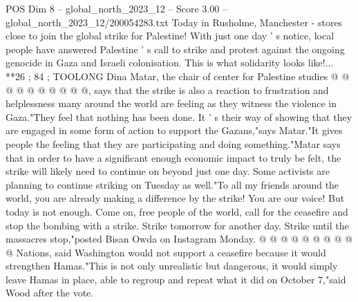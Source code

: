 \begin{textsample}{POS Dim 8 – global\_north\_2023\_12 – Score 3.00 – global\_north\_2023\_12/200054283.txt}
Today in Rusholme, Manchester - stores close to join the global strike for Palestine!
With just one day ' s notice, local people have answered Palestine ' s call to strike and protest against the ongoing genocide in Gaza and Israeli colonisation.
This is what solidarity looks like!... **26 ; 84 ; TOOLONG Dina Matar, the chair of center for Palestine studies @ @ @ @ @ @ @ @ @ @, says that the strike is also a reaction to frustration and helplessness many around the world are feeling as they witness the violence in Gaza."They feel that nothing has been done.
It ' s their way of showing that they are engaged in some form of action to support the Gazans,"says Matar."It gives people the feeling that they are participating and doing something."Matar says that in order to have a significant enough economic impact to truly be felt, the strike will likely need to continue on beyond just one day.
Some activists are planning to continue striking on Tuesday as well."To all my friends around the world, you are already making a difference by the strike!
You are our voice!
But today is not enough.
Come on, free people of the world, call for the ceasefire and stop the bombing with a strike.
Strike tomorrow for another day.
Strike until the massacres stop,"posted Bisan Owda on Instagram Monday. @ @ @ @ @ @ @ @ @ @ Nations, said Washington would not support a ceasefire because it would strengthen Hamas."This is not only unrealistic but dangerous, it would simply leave Hamas in place, able to regroup and repeat what it did on October 7,"said Wood after the vote.

\end{textsample}

